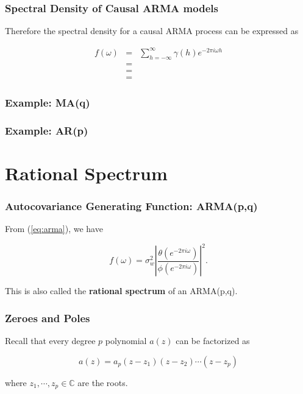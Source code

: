 \documentclass[%
xcolor=pdftex]{beamer}
\begin{document}
\begin{frame}
\frametitle{Spectral Density of Causal ARMA models}

Therefore the spectral density for a causal ARMA process can be expressed as

\begin{eqnarray} \label{eq:arma}
f(\omega) &=& \sum_{h=-\infty}^{\infty} \gamma(h) e^{-2 \pi i \omega h} \nonumber \\
          &=& \nonumber \\
          &=& \nonumber \\
          &=&
\end{eqnarray}

\end{frame}

\begin{frame}
\frametitle{Example: MA(q)}


\end{frame}

\begin{frame}
\frametitle{Example: AR(p)}


\end{frame}

\section{Rational Spectrum}
\frame{\tableofcontents[currentsection]}

\begin{frame}
\frametitle{Autocovariance Generating Function: ARMA(p,q)}


From (\ref{eq:arma}), we have

\begin{equation*} 
f(\omega) = \sigma_w^2 \left \lvert \frac{\theta(e^{-2 \pi i \omega})}{\phi(e^{-2 \pi i \omega})} \right \rvert ^2.
\end{equation*}

This is also called the \textbf{rational spectrum} of an ARMA(p,q).


\end{frame}

\begin{frame}
\frametitle{Zeroes and Poles}

Recall that every degree $p$ polynomial $a(z)$ can be factorized as

$$
a(z) = a_p(z-z_1)(z-z_2)\cdots(z-z_p)
$$

where $z_1, \cdots, z_p \in \mathbb{C}$ are the roots.

\end{frame}
\end{document}
